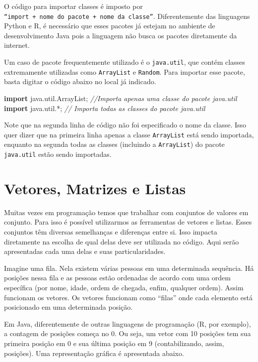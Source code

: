 \documentclass[
]{book}
\newenvironment{Shaded}{\begin{snugshade}}{\end{snugshade}}
\newcommand{\CommentTok}[1]{\textcolor[rgb]{0.56,0.35,0.01}{\textit{#1}}}
\newcommand{\ImportTok}[1]{#1}
\newcommand{\KeywordTok}[1]{\textcolor[rgb]{0.13,0.29,0.53}{\textbf{#1}}}
\begin{document}
O código para importar classes é imposto por \texttt{“import\ +\ nome\ do\ pacote\ +\ nome\ da\ classe”}. Diferentemente das linguagens Python e R, é necessário que esses pacotes já estejam no ambiente de desenvolvimento Java pois a linguagem não busca os pacotes diretamente da internet.

Um caso de pacote frequentemente utilizado é o \texttt{java.util}, que contém classes extremamente utilizadas como \texttt{ArrayList} e \texttt{Random}. Para importar esse pacote, basta digitar o código abaixo no local já indicado.

\begin{Shaded}
\begin{Highlighting}[]
\KeywordTok{import}\ImportTok{ java.util.ArrayList;} \CommentTok{//Importa apenas uma classe do pacote java.util}
\KeywordTok{import}\ImportTok{ java.util.*;} \CommentTok{// Importa todas as classes do pacote java.util}
\end{Highlighting}
\end{Shaded}

Note que na segunda linha de código não foi especificado o nome da classe. Isso quer dizer que na primeira linha apenas a classe \texttt{ArrayList} está sendo importada, enquanto na segunda todas as classes (incluindo a \texttt{ArrayList}) do pacote \texttt{java.util} estão sendo importadas.

\hypertarget{vetores-matrizes-e-listas}{%
\chapter{Vetores, Matrizes e Listas}\label{vetores-matrizes-e-listas}}

Muitas vezes em programação temos que trabalhar com conjuntos de valores em conjunto. Para isso é possível utilizarmos as ferramentas de vetores e listas. Esses conjuntos têm diversas semelhanças e diferenças entre si. Isso impacta diretamente na escolha de qual delas deve ser utilizada no código. Aqui serão apresentadas cada uma delas e suas particularidades.

Imagine uma fila. Nela existem várias pessoas em uma determinada sequência. Há posições nessa fila e as pessoas estão ordenadas de acordo com uma ordem específica (por nome, idade, ordem de chegada, enfim, qualquer ordem). Assim funcionam os vetores. Os vetores funcionam como ``filas'' onde cada elemento está posicionado em uma determinada posição.

Em Java, diferentemente de outras linguagens de programação (R, por exemplo), a contagem de posições começa no 0. Ou seja, um vetor com 10 posições tem sua primeira posição em 0 e sua última posição em 9 (contabilizando, assim, posições). Uma representação gráfica é apresentada abaixo.
\end{document}
